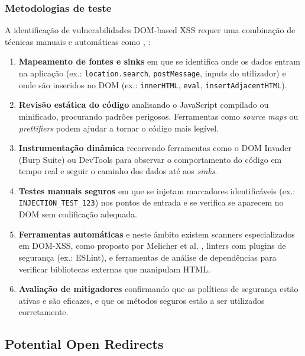 \subsubsection{Metodologias de teste}
\label{subsubsec:metodologias-teste-dom-xss}

A identificação de vulnerabilidades DOM-based XSS requer uma combinação de técnicas manuais e automáticas como \cite{ref29}, \cite{ref33}:

\begin{enumerate}
    \item \textbf{Mapeamento de fontes e sinks} em que se identifica onde os dados entram na aplicação (ex.: \texttt{location.search}, \texttt{postMessage}, inputs do utilizador) e onde são inseridos no DOM (ex.: \texttt{innerHTML}, \texttt{eval}, \texttt{insertAdjacentHTML}).
    
    \item \textbf{Revisão estática do código} analisando o JavaScript compilado ou minificado, procurando padrões perigosos. Ferramentas como \textit{source maps} ou \textit{prettifiers} podem ajudar a tornar o código mais legível.
    
    \item \textbf{Instrumentação dinâmica} recorrendo ferramentas como o DOM Invader (Burp Suite) ou DevTools para observar o comportamento do código em tempo real e seguir o caminho dos dados até aos \textit{sinks}.
    
    \item \textbf{Testes manuais seguros} em que se injetam marcadores identificáveis (ex.: \texttt{INJECTION\_TEST\_123}) nos pontos de entrada e se verifica se aparecem no DOM sem codificação adequada.
    
    \item \textbf{Ferramentas automáticas} e neste âmbito existem scanners especializados em DOM-XSS, como proposto por Melicher et al. \cite{ref33}, linters com plugins de segurança (ex.: ESLint), e ferramentas de análise de dependências para verificar bibliotecas externas que manipulam HTML.
    
    \item \textbf{Avaliação de mitigadores} confirmando que as políticas de segurança estão ativas e são eficazes, e que os métodos seguros estão a ser utilizados corretamente.
\end{enumerate}

\subsection{Potential Open Redirects}
\label{subsec:potential-open-redirects}

